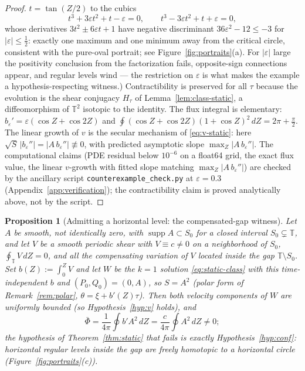 \documentclass[11pt]{amsart}
\newtheorem{proposition}[theorem]{Proposition}
\theoremstyle{definition}
\theoremstyle{remark}
\newcommand{\T}{\mathbb{T}}
\newcommand{\Fbar}{\bar\Phi}
\begin{document}
\begin{proof}
$t=\tan(Z/2)$ to the cubics
\[
  t^3+3\varepsilon t^2+t-\varepsilon=0,\qquad
  t^3-3\varepsilon t^2+t+\varepsilon=0 ,
\]
whose derivatives $3t^2\pm6\varepsilon t+1$ have negative discriminant
$36\varepsilon^2-12\le-3$ for $|\varepsilon|\le\tfrac12$: exactly one
maximum and one minimum away from the critical circle, consistent with
the pure-oval portrait; see Figure~\ref{fig:portraits}(a). For
$|\varepsilon|$ large the positivity conclusion from the factorization
fails, opposite-sign connections appear, and regular levels wind ---
the restriction on $\varepsilon$ is what makes the example a
hypothesis-respecting witness.) Contractibility is preserved for all
$\tau$ because the evolution is the shear conjugacy $H_\tau$ of
Lemma~\ref{lem:class-static}, a diffeomorphism of $\T^2$ isotopic to
the identity. The flux integral is elementary:
$b_\varepsilon'=\varepsilon(\cos Z+\cos2Z)$ and
$\oint(\cos Z+\cos2Z)(1+\cos Z)^2\,dZ=2\pi+\tfrac\pi2$. The linear
growth of $v$ is the secular mechanism of \eqref{eq:v-static}: here
$\sqrt S\,|b_\varepsilon''|=|A\,b_\varepsilon''|\not\equiv0$, with
predicted asymptotic slope $\max_Z|A\,b_\varepsilon''|$. The
computational claims (PDE residual below $10^{-6}$ on a float64 grid,
the exact flux value, the linear $v$-growth with fitted slope matching
$\max_Z|A\,b_\varepsilon''|$) are checked by the ancillary script
\texttt{counterexample\_check.py} at $\varepsilon=0.3$
(Appendix~\ref{app:verification}); the contractibility claim is proved
analytically above, not by the script.
\end{proof}

\begin{proposition}[Admitting a horizontal level: the compensated-gap
witness]\label{prop:gapwitness}
Let $A$ be smooth, not identically zero, with
$\operatorname{supp}A\subset S_0$ for a closed interval
$S_0\subsetneq\T$, and let $V$ be a smooth periodic shear with
$V\equiv c\neq0$ on a neighborhood of $S_0$, $\oint_\T V\,dZ=0$, and
all the compensating variation of $V$ located inside the gap
$\T\setminus S_0$. Set $b(Z):=\int_0^Z V$ and let $W$ be the $k=1$
solution \eqref{eq:static-class} with this time-independent $b$ and
$(P_0,Q_0)=(0,A)$, so $S=A^2$ (polar form of Remark~\ref{rem:polar},
$\theta=\xi+b'(Z)\tau$). Then both velocity components of $W$ are
uniformly bounded (so Hypothesis~\ref{hyp:v} holds), and
\[
  \Fbar=\frac1{4\pi}\oint b'A^2\,dZ=\frac{c}{4\pi}\oint A^2\,dZ\neq0 ;
\]
the hypothesis of Theorem~\ref{thm:static} that fails is exactly
Hypothesis~\ref{hyp:conf}: horizontal regular levels inside the gap are
freely homotopic to a horizontal circle (Figure~\ref{fig:portraits}(c)).
\end{proposition}
\end{document}
